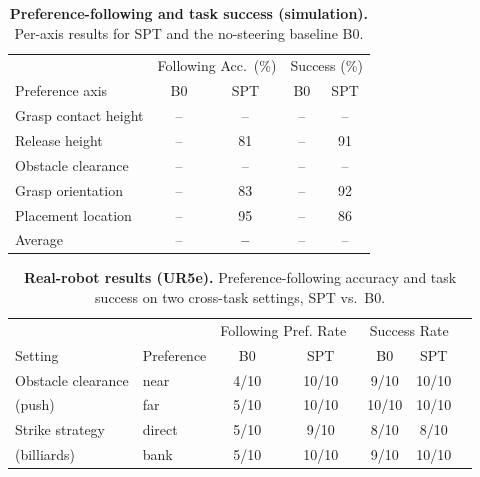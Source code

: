 \documentclass{article}
\begin{document}
\begin{table}[t]
  \centering
  \small
  \caption{\textbf{Preference-following and task success (simulation).} Per-axis
  results for SPT and the no-steering baseline B0.}
  \label{tab:sim_main}
  \begin{tabular}{lcccc}
    \hline
    & \multicolumn{2}{c}{Following Acc.\ (\%)} & \multicolumn{2}{c}{Success (\%)} \\
    Preference axis & B0 & SPT & B0 & SPT \\
    \hline
    Grasp contact height & -- & -- & -- & -- \\
    Release height       & -- & 81 & -- & 91 \\
    Obstacle clearance   & -- & -- & -- & -- \\
    Grasp orientation    & -- & 83 & -- & 92 \\
    Placement location   & -- & 95 & -- & 86 \\
    \hline
    Average              & -- & \textbf{--} & -- & -- \\
    \hline
  \end{tabular}
\end{table}

\begin{table}[t]
  \centering
  \small
  \caption{\textbf{Real-robot results (UR5e).} Preference-following accuracy and
  task success on two cross-task settings, SPT vs.\ B0. }
  \label{tab:real_main}
  \begin{tabular}{llccccc}
    \hline
    & & \multicolumn{2}{c}{Following Pref. Rate\ } & \multicolumn{2}{c}{Success Rate} \\
    Setting & Preference & B0 & SPT & B0 & SPT \\
    \hline
    Obstacle clearance & near    & 4/10 & 10/10 & 9/10 & 10/10 \\
    (push)             & far     & 5/10 & 10/10 & 10/10 & 10/10 \\
    Strike strategy    & direct  & 5/10 & 9/10 & 8/10 & 8/10 \\
    (billiards)        & bank    & 5/10 & 10/10 & 9/10 & 10/10 \\
    \hline
  \end{tabular}
\end{table}
\end{document}
